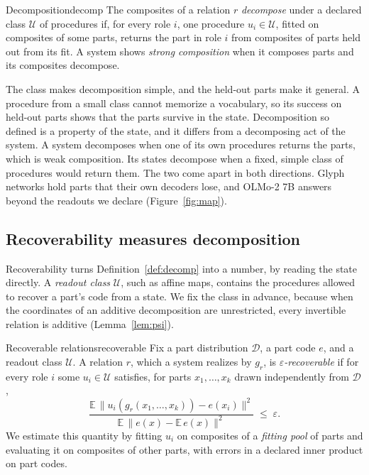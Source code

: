 \documentclass[10pt]{article}
\theoremstyle{plain}
\theoremstyle{remark}
\newcommand{\U}{\mathcal{U}}
\newcommand{\D}{\mathcal{D}}
\begin{document}
\begin{defbox}{Decomposition}{decomp}
The composites of a relation $r$ \emph{decompose} under a declared class $\U$ of procedures if, for every role $i$, one procedure $u_i \in \U$, fitted on composites of some parts, returns the part in role $i$ from composites of parts held out from its fit. A system shows \emph{strong composition} when it composes parts and its composites decompose.
\end{defbox}

The class makes decomposition simple, and the held-out parts make it general. A procedure from a small class cannot memorize a vocabulary, so its success on held-out parts shows that the parts survive in the state. Decomposition so defined is a property of the state, and it differs from a decomposing act of the system. A system decomposes when one of its own procedures returns the parts, which is weak composition. Its states decompose when a fixed, simple class of procedures would return them. The two come apart in both directions. Glyph networks hold parts that their own decoders lose, and OLMo-2 7B answers beyond the readouts we declare (Figure~\ref{fig:map}).

\subsection{Recoverability measures decomposition}
\label{sec:repcomp}

Recoverability turns Definition~\ref{def:decomp} into a number, by reading the state directly. A \emph{readout class} $\U$, such as affine maps, contains the procedures allowed to recover a part's code from a state. We fix the class in advance, because when the coordinates of an additive decomposition are unrestricted, every invertible relation is additive (Lemma~\ref{lem:psi}).

\begin{defbox}{Recoverable relations}{recoverable}
Fix a part distribution $\D$, a part code $e$, and a readout class $\U$. A relation $r$, which a system realizes by $g_r$, is \emph{$\varepsilon$-recoverable} if for every role $i$ some $u_i \in \U$ satisfies, for parts $x_1, \ldots, x_k$ drawn independently from $\D$,
\begin{equation}
  \frac{\mathbb{E}\,\lVert u_i(g_r(x_1,\ldots,x_k)) - e(x_i) \rVert^2}{\mathbb{E}\,\lVert e(x) - \mathbb{E}\,e(x) \rVert^2} \;\le\; \varepsilon .
  \label{eq:recover}
\end{equation}
We estimate this quantity by fitting $u_i$ on composites of a \emph{fitting pool} of parts and evaluating it on composites of other parts, with errors in a declared inner product on part codes.
\end{defbox}
\end{document}
